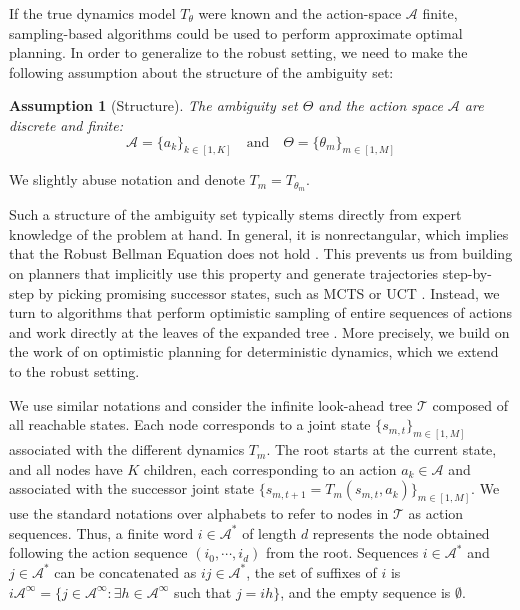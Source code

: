 \documentclass{article}
\newtheorem{assumption}{Assumption}
\begin{document}
\vspace{-2mm}
If the true dynamics model $T_\theta$ were known and the action-space $\mathcal{A}$ finite, sampling-based algorithms could be used to perform approximate optimal planning. In order to generalize to the robust setting, we need to make the following assumption about the structure of the ambiguity set:

\begin{assumption}[Structure]
The ambiguity set $\Theta$ and the action space $\mathcal{A}$ are discrete and finite:
\begin{equation}
\mathcal{A} = \{a_k\}_{k\in[1, K]} \quad \text{and} \quad \Theta = \{\theta_m\}_{m\in[1, M]}
\end{equation}
\end{assumption}

\vspace{-3mm}
\noindent
We slightly abuse notation and denote $T_m = T_{\theta_m}$.

\vspace{-1mm}
Such a structure of the ambiguity set typically stems directly from expert knowledge of the problem at hand. In general, it is nonrectangular, which implies that the Robust Bellman Equation does not hold \citep{Wiesemann2013}. This prevents us from building on planners that implicitly use this property and generate trajectories step-by-step by picking promising successor states, such as MCTS \citep{Coulom2006} or UCT \citep{Kocsis2006}.
Instead, we turn to algorithms that perform optimistic sampling of entire sequences of actions and work directly at the leaves of the expanded tree \citep[see, e.g.][]{Bubeck2010}. More precisely, we build on the work of \citet{Hren2008} on optimistic planning for deterministic dynamics, which we extend to the robust setting.

\vspace{-1mm}
We use similar notations and consider the infinite look-ahead tree $\mathcal{T}$ composed of all reachable states. Each node corresponds to a joint state $\{s_{m,t}\}_{m\in[1, M]}$ associated with the different dynamics $T_m$. The root starts at the current state, and all nodes have $K$ children, each corresponding to an action $a_k\in\mathcal{A}$ and associated with the successor joint state $\{s_{m,t+1}=T_m(s_{m,t}, a_k)\}_{m\in[1, M]}$. We use the standard notations over alphabets to refer to nodes in $\mathcal{T}$ as action sequences. Thus, a finite word $i \in \mathcal{A}^*$ of length $d$ represents the node obtained following the action sequence $(i_0, \cdots, i_d)$ from the root. Sequences $i\in\mathcal{A}^*$ and $j\in\mathcal{A}^*$ can be concatenated as $ij\in\mathcal{A}^*$, the set of suffixes of $i$ is $i\mathcal{A}^\infty = \{j\in\mathcal{A}^\infty: \exists h\in\mathcal{A}^\infty$ such that $j=ih\}$, and the empty sequence is $\emptyset$.
\end{document}
